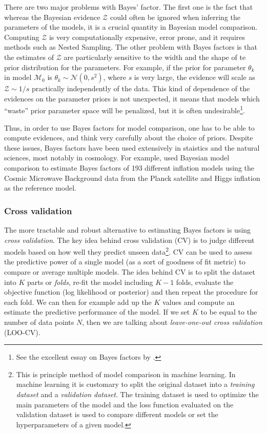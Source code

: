 \documentclass[12pt,dvipsnames]{report}
\begin{document}
There are two major problems with Bayes' factor. The first one is the fact that
whereas the Bayesian evidence $\mathcal{Z}$ could often be ignored when inferring the 
parameters of the models, it is a crucial quantity in Bayesian model comparison. 
Computing $\mathcal{Z}$ is very computationally expensive, error prone, and it
 requires methods such as Nested Sampling.
The other problem with Bayes
factors is that the estimates of $\mathcal{Z}$ are particularly sensitive to the 
width and the shape of te prior distribution for the parameters. For example, if 
the prior for parameter $\theta_k$
in model $\mathcal{M}_0$ is $\theta_k\sim \mathcal{N}(0, s^2)$, where $s$ is
very large, the evidence will scale as $\mathcal{Z}\sim 1/s$ practically
independently of the data. This kind of dependence of the evidences on the
parameter priors is not unexpected, it means that models which ``waste'' prior
parameter space will be penalized, but it is often undesirable\footnote{See the 
excellent essay on Bayes factors by \citet{navarro_2020}.}. 

Thus, in order to use Bayes factors for model comparison, one has to be able to
compute evidences, and think very carefully about the choice of priors. Despite
these issues, Bayes factors have been used extensively in staistics and the 
natural sciences, most notably in cosmology. For example,\citet{arXiv:1312.3529} 
used Bayesian model comparison to estimate Bayes factors of 193 different 
inflation models using the Cosmic Microwave Background
data from the Planck satellite and Higgs inflation as the reference model. 

\subsubsection{Cross validation}
The more tractable and robust alternative to estimating Bayes factors is using 
\textsl{cross validation}. The key idea behind cross validation (CV) is to judge 
different models based on how well they predict unseen data\footnote{This is 
principle method of model comparison in machine learning. In machine learning 
it is customary to split the original dataset into a \textsl{training dataset} 
and a \textsl{validation dataset}. The training dataset is used to optimize 
the main parameters of the model and the loss function evaluated on the 
validation dataset is used to compare different models or set the hyperparameters
of a given model.}. 
CV can be used to assess the predictive power of a single model (as a sort of 
goodness of fit metric) to compare or average multiple models. 
The idea behind CV is to split the dataset into $K$ parts or \textsl{folds}, 
re-fit the model including $K-1$ folds, evaluate the objective function (log 
likelihood or posterior) and then repeat the procedure for each fold. We 
can then for example add up the $K$ values and compute an estimate 
the predictive performance of the model. 
If we set $K$ to be equal to the number of data points $N$, then we 
are talking about \textsl{leave-one-out cross validation} (LOO-CV).
\end{document}

